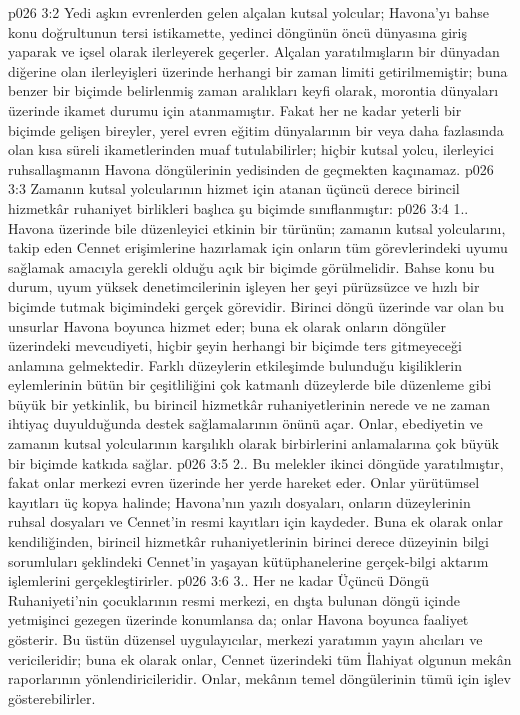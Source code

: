 \vs p026 3:2 Yedi aşkın evrenlerden gelen alçalan kutsal yolcular; Havona’yı bahse konu doğrultunun tersi istikamette, yedinci döngünün öncü dünyasına giriş yaparak ve içsel olarak ilerleyerek geçerler. Alçalan yaratılmışların bir dünyadan diğerine olan ilerleyişleri üzerinde herhangi bir zaman limiti getirilmemiştir; buna benzer bir biçimde belirlenmiş zaman aralıkları keyfi olarak, morontia dünyaları üzerinde ikamet durumu için atanmamıştır. Fakat her ne kadar yeterli bir biçimde gelişen bireyler, yerel evren eğitim dünyalarının bir veya daha fazlasında olan kısa süreli ikametlerinden muaf tutulabilirler; hiçbir kutsal yolcu, ilerleyici ruhsallaşmanın Havona döngülerinin yedisinden de geçmekten kaçınamaz.
\vs p026 3:3 Zamanın kutsal yolcularının hizmet için atanan üçüncü derece birincil hizmetkâr ruhaniyet birlikleri başlıca şu biçimde sınıflanmıştır:
\vs p026 3:4 1.\bibnobreakspace {}. Havona üzerinde bile düzenleyici etkinin bir türünün; zamanın kutsal yolcularını, takip eden Cennet erişimlerine hazırlamak için onların tüm görevlerindeki uyumu sağlamak amacıyla gerekli olduğu açık bir biçimde görülmelidir. Bahse konu bu durum, uyum yüksek denetimcilerinin işleyen her şeyi pürüzsüzce ve hızlı bir biçimde tutmak biçimindeki gerçek görevidir. Birinci döngü üzerinde var olan bu unsurlar Havona boyunca hizmet eder; buna ek olarak onların döngüler üzerindeki mevcudiyeti, hiçbir şeyin herhangi bir biçimde ters gitmeyeceği anlamına gelmektedir. Farklı düzeylerin etkileşimde bulunduğu kişiliklerin eylemlerinin bütün bir çeşitliliğini çok katmanlı düzeylerde bile düzenleme gibi büyük bir yetkinlik, bu birincil hizmetkâr ruhaniyetlerinin nerede ve ne zaman ihtiyaç duyulduğunda destek sağlamalarının önünü açar. Onlar, ebediyetin ve zamanın kutsal yolcularının karşılıklı olarak birbirlerini anlamalarına çok büyük bir biçimde katkıda sağlar.
\vs p026 3:5 2.\bibnobreakspace {}. Bu melekler ikinci döngüde yaratılmıştır, fakat onlar merkezi evren üzerinde her yerde hareket eder. Onlar yürütümsel kayıtları üç kopya halinde; Havona’nın yazılı dosyaları, onların düzeylerinin ruhsal dosyaları ve Cennet’in resmi kayıtları için kaydeder. Buna ek olarak onlar kendiliğinden, birincil hizmetkâr ruhaniyetlerinin birinci derece düzeyinin bilgi sorumluları şeklindeki Cennet’in yaşayan kütüphanelerine gerçek\hyp{}bilgi aktarım işlemlerini gerçekleştirirler.
\vs p026 3:6 3.\bibnobreakspace {}. Her ne kadar Üçüncü Döngü Ruhaniyeti’nin çocuklarının resmi merkezi, en dışta bulunan döngü içinde yetmişinci gezegen üzerinde konumlansa da; onlar Havona boyunca faaliyet gösterir. Bu üstün düzensel uygulayıcılar, merkezi yaratımın yayın alıcıları ve vericileridir; buna ek olarak onlar, Cennet üzerindeki tüm İlahiyat olgunun mekân raporlarının yönlendiricileridir. Onlar, mekânın temel döngülerinin tümü için işlev gösterebilirler.
